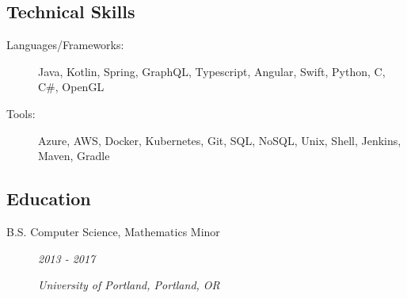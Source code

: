 \documentclass{article}
\def \intraspace {0.1em}
\begin{document}
\subsection*{Technical Skills}
    \begin{description}    
        \item[Languages/Frameworks:] 
            Java,
            Kotlin,
            Spring,
            GraphQL,
            Typescript,
            Angular,
            Swift,
            Python,
            C,
            C\#,
            OpenGL

            \vspace{\intraspace}

        \item[Tools:] 
            Azure,
            AWS,
            Docker,
            Kubernetes,
            Git,
            SQL,
            NoSQL,
            Unix,
            Shell,
            Jenkins,
            Maven,
            Gradle
    \end{description}
    
\subsection*{Education}
    \begin{description}
        \item[B.S. Computer Science, Mathematics Minor]\hfill \textit{2013 - 2017}

        \textit{University of Portland, Portland, OR}
    \end{description}
\end{document}
